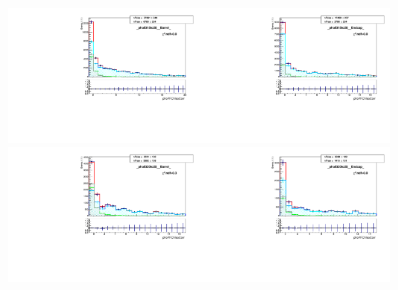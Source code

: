 \begin{figure}[htb]
  \begin{center}
   \includegraphics[width=0.45\textwidth]{../figs/figs_v11/ELECTRON_WGamma/MCclosureWjetsPlusWg/c_TEMPL_CHISO_UNblind__phoEt15to20__Barrel__RooFit_MCclosure.pdf}\includegraphics[width=0.45\textwidth]{../figs/figs_v11/ELECTRON_WGamma/MCclosureWjetsPlusWg/c_TEMPL_CHISO_UNblind__phoEt15to20__Endcap__RooFit_MCclosure.pdf}\\
   \includegraphics[width=0.45\textwidth]{../figs/figs_v11/ELECTRON_WGamma/MCclosureWjetsPlusWg/c_TEMPL_CHISO_UNblind__phoEt20to25__Barrel__RooFit_MCclosure.pdf}\includegraphics[width=0.45\textwidth]{../figs/figs_v11/ELECTRON_WGamma/MCclosureWjetsPlusWg/c_TEMPL_CHISO_UNblind__phoEt20to25__Endcap__RooFit_MCclosure.pdf}\\

\end{center}
\end{figure}
